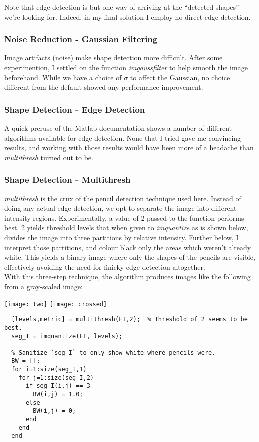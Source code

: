 \documentclass{article}
\begin{document}
Note that edge detection is but one way of arriving at the ``detected shapes''
we're looking for. Indeed, in my final solution I employ no direct edge
detection.

\subsubsection{Noise Reduction - Gaussian Filtering}
Image artifacts (noise) make shape detection more difficult. After some
experimention, I settled on the function \emph{imgaussfilter} to help
smooth the image beforehand. While we have a choice of $\sigma$ to affect
the Gaussian, no choice different from the default showed any performance
improvement.

\subsubsection{Shape Detection - Edge Detection}
A quick preruse of the Matlab documentation shows a number of different
algorithms available for edge detection. None that I tried gave me
convincing results, and working with those results would have been
more of a headache than \emph{multithresh} turned out to be.

\subsubsection{Shape Detection - Multithresh}
 \emph{multithresh} is the crux of the pencil detection technique used
 here. Instead of doing any actual edge detection, we opt to
 separate the image into different intensity
 regions. Experimentally, a value of 2 passed to the function
 performs best. 2 yields threshold levels that when given to
 \emph{imquantize} as is shown below, divides the image into three
 partitions by relative intensity. Further below, I interpret
 those partitions, and colour black only the areas which weren't
 already white. This yields a binary image where only the shapes
 of the pencils are visible, effectively avoiding the need for
 finicky edge detection altogether.\\

With this three-step technique, the algorithm produces images like
the following from a gray-scaled image:

\begin{center}
  \texttt{[image: two]}
  \texttt{[image: crossed]}    
\end{center}

\begin{lstlisting}
  [levels,metric] = multithresh(FI,2);  % Threshold of 2 seems to be best.
  seg_I = imquantize(FI, levels);

  % Sanitize `seg_I` to only show white where pencils were.
  BW = [];
  for i=1:size(seg_I,1)
    for j=1:size(seg_I,2)
      if seg_I(i,j) == 3
        BW(i,j) = 1.0;
      else
        BW(i,j) = 0;
      end
    end
  end
\end{lstlisting}
\end{document}
